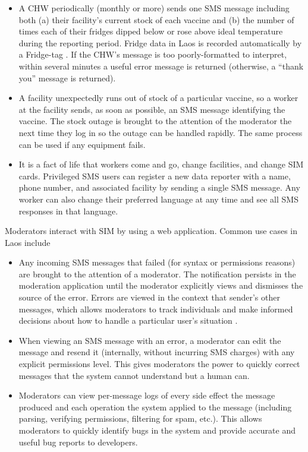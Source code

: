 \documentclass{acm_proc_article-sp}
\begin{document}
\begin{itemize}
\item A CHW periodically (monthly or more) sends one SMS message including both (a) their facility's current stock of each vaccine and (b) the number of times each of their fridges dipped below or rose above ideal temperature during the reporting period. Fridge data in Laos is recorded automatically by a Fridge-tag \textsuperscript{\textregistered} \cite{fridgetag}. If the CHW's message is too poorly-formatted to interpret, within several minutes a useful error message is returned (otherwise, a ``thank you'' message is returned). 
\item A facility unexpectedly runs out of stock of a particular vaccine, so a worker at the facility sends, as soon as possible, an SMS message identifying the vaccine. The stock outage is brought to the attention of the moderator the next time they log in so the outage can be handled rapidly. The same process can be used if any equipment fails.
\item It is a fact of life that workers come and go, change facilities, and change SIM cards. Privileged SMS users can register a new data reporter with a name, phone number, and associated facility by sending a single SMS message. Any worker can also change their preferred language at any time and see all SMS responses in that language.
\end{itemize}

Moderators interact with SIM by using a web application. Common use cases in Laos include

\begin{itemize}
\item Any incoming SMS messages that failed (for syntax or permissions reasons) are brought to the attention of a moderator. The notification persists in the moderation application until the moderator explicitly views and dismisses the source of the error. Errors are viewed in the context that sender's other messages, which allows moderators to track individuals and make informed decisions about how to handle a particular user's situation
.\item When viewing an SMS message with an error, a moderator can edit the message and resend it (internally, without incurring SMS charges) with any explicit permissions level. This gives moderators the power to quickly correct messages that the system cannot understand but a human can.
\item Moderators can view per-message logs of every side effect the message produced and each operation the system applied to the message (including parsing, verifying permissions, filtering for spam, etc.). This allows moderators to quickly identify bugs in the system and provide accurate and useful bug reports to developers.
\end{itemize}
\end{document}
